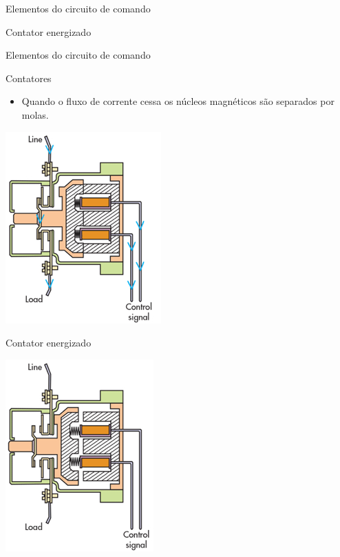 \begin{frame}{Elementos do circuito de comando}
\begin{minipage}{0.45\linewidth}
	Contator energizado
\end{minipage}


\end{frame}

\begin{frame}{Elementos do circuito de comando}
\begin{block}{Contatores}
	\begin{itemize}
		\item Quando o fluxo de corrente cessa os núcleos magnéticos são separados por molas.
	\end{itemize}
\end{block}
\begin{minipage}{0.45\linewidth}
	\centering
	\includegraphics[width=0.6\linewidth]{Figuras/Ch06/fig9.jpg}
	
	Contator energizado
\end{minipage}
\hfill
\begin{minipage}{0.45\linewidth}
	\centering
	\includegraphics[width=0.6\linewidth]{Figuras/Ch06/fig8.jpg}
	

\end{minipage}
\end{frame}
